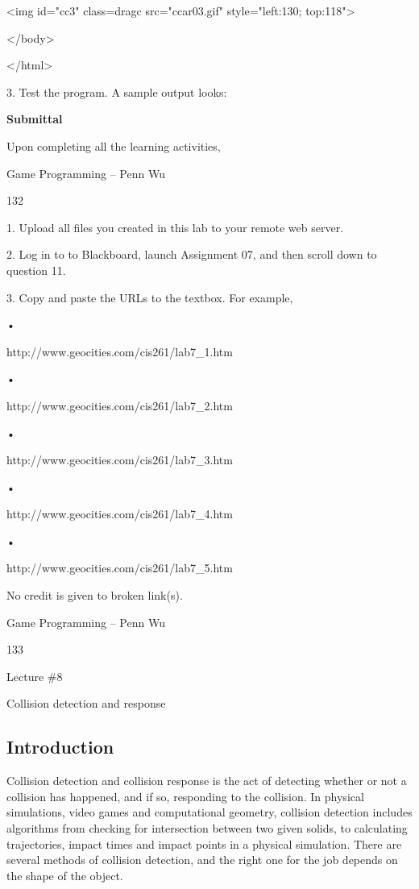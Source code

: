 \documentclass[
]{article}
\begin{document}
\textless img id="cc3" class=dragc src="ccar03.gif" style="left:130;
top:118"\textgreater{}

\textless/body\textgreater{}

\textless/html\textgreater{}

3. Test the program. A sample output looks:

\textbf{Submittal}

Upon completing all the learning activities,

Game Programming -- Penn Wu

132

\protect\hypertarget{index_split_008.htmlux5cux23p133}{}{}1. Upload all
files you created in this lab to your remote web server.

2. Log in to to Blackboard, launch Assignment 07, and then scroll down
to question 11.

3. Copy and paste the URLs to the textbox. For example,

•

http://www.geocities.com/cis261/lab7\_1.htm

•

http://www.geocities.com/cis261/lab7\_2.htm

•

http://www.geocities.com/cis261/lab7\_3.htm

•

http://www.geocities.com/cis261/lab7\_4.htm

•

http://www.geocities.com/cis261/lab7\_5.htm

No credit is given to broken link(s).

Game Programming -- Penn Wu

133

\protect\hypertarget{index_split_008.htmlux5cux23p134}{}{}

Lecture \#8

Collision detection and response

\protect\hypertarget{index_split_009.html}{}{}

\hypertarget{index_split_009.htmlux5cux23calibre_pb_8}{%
\subsection{Introduction}\label{index_split_009.htmlux5cux23calibre_pb_8}}

Collision detection and collision response is the act of detecting
whether or not a collision has happened, and if so, responding to the
collision. In physical simulations, video games and computational
geometry, collision detection includes algorithms from checking for
intersection between two given solids, to calculating trajectories,
impact times and impact points in a physical simulation. There are
several methods of collision detection, and the right one for the job
depends on the shape of the object.
\end{document}
